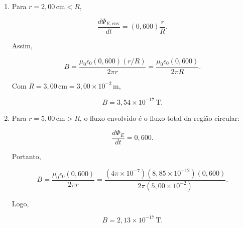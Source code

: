 \begin{enumerate}
    \item[(a)] Para \(r=2{,}00\,\text{cm}<R\),

    \[
    \frac{d\Phi_{E,\text{env}}}{dt}
    =
    (0{,}600)\frac{r}{R}.
    \]

    Assim,

    \[
    B=
    \frac{\mu_0\epsilon_0(0{,}600)(r/R)}{2\pi r}
    =
    \frac{\mu_0\epsilon_0(0{,}600)}{2\pi R}.
    \]

    Com \(R=3{,}00\,\text{cm}=3{,}00\times 10^{-2}\,\text{m}\),

    \[
    B=3{,}54\times 10^{-17}\,\text{T}.
    \]

    \item[(b)] Para \(r=5{,}00\,\text{cm}>R\), o fluxo envolvido é o fluxo
    total da região circular:

    \[
    \frac{d\Phi_E}{dt}=0{,}600.
    \]

    Portanto,

    \[
    B=
    \frac{\mu_0\epsilon_0(0{,}600)}{2\pi r}
    =
    \frac{(4\pi\times 10^{-7})(8{,}85\times 10^{-12})(0{,}600)}
    {2\pi(5{,}00\times 10^{-2})}.
    \]

    Logo,

    \[
    B=2{,}13\times 10^{-17}\,\text{T}.
    \]
\end{enumerate}

\vspace{1cm}
